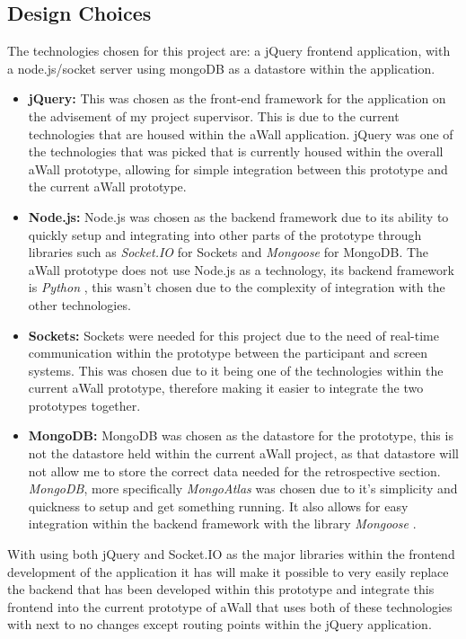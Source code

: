 \subsection{Design Choices}
The technologies chosen for this project are: a jQuery frontend application, with a node.js/socket server using mongoDB as a datastore within the application. 
\begin{itemize}
\item \textbf{jQuery:} \cite{js.foundation_2018}  This was chosen as the front-end framework for the application on the advisement of my project supervisor. This is due to the current technologies that are housed within the aWall application. jQuery was one of the technologies that was picked that is currently housed within the overall aWall prototype, allowing for simple integration between this prototype and the current aWall prototype. 
\item \textbf{Node.js:} \cite{foundation_2018} Node.js was chosen as the backend framework due to its ability to quickly setup and integrating into other parts of the prototype through libraries such as \textit{Socket.IO} \cite{socket.io_2018} for Sockets and \textit{Mongoose} \cite{mongoose-odm-v5.1.3_2018} for MongoDB. The aWall prototype does not use Node.js as a technology, its backend framework is \textit{Python} \cite{welcome-to-python.org_2018}, this wasn't chosen due to the complexity of integration with the other technologies. 
\item \textbf{Sockets:} \cite{socket.io_2018} Sockets were needed for this project due to the need of real-time communication within the prototype between the participant and screen systems. This was chosen due to it being one of the technologies within the current aWall prototype, therefore making it easier to integrate the two prototypes together.
\item \textbf{MongoDB:} \cite{mongodb-for-giant-ideas_2018} MongoDB was chosen as the datastore for the prototype, this is not the datastore held within the current aWall project, as that datastore will not allow me to store the correct data needed for the retrospective section. \textit{MongoDB}, more specifically \textit{MongoAtlas} \cite{fully-managed-mongodb-hosted-on-aws-azure-and-gcp_2018} was chosen due to it's simplicity and quickness to setup and get something running. It also allows for easy integration within the backend framework with the library \textit{Mongoose} \cite{mongoose-odm-v5.1.3_2018}.
\end{itemize}
With using both jQuery and Socket.IO as the major libraries within the frontend development of the application it has will make it possible to very easily replace the backend that has been developed within this prototype and integrate this frontend into the current prototype of aWall that uses both of these technologies with next to no changes except routing points within the jQuery application.




